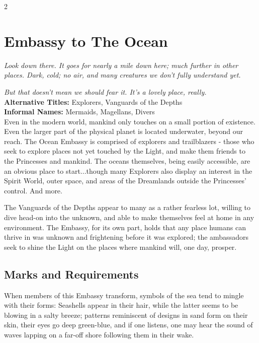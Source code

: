 \begin{multicols}{2}
\section*{Embassy to The Ocean}
\label{sec:EmbassyOcean}

\textit{Look down there. It goes for nearly a mile down here; much further in other places. Dark, cold; no air, and many creatures we don't fully understand yet.}

\textit{But that doesn't mean we should fear it. It's a lovely place, really.} \\

\noindent \textbf{Alternative Titles:} Explorers, Vanguards of the Depths\\

\noindent \textbf{Informal Names:} Mermaids, Magellans, Divers \\

\noindent Even in the modern world, mankind only touches on a small portion of existence. Even the larger part of the physical planet is located underwater, beyond our reach. The Ocean Embassy is comprised of explorers and trailblazers - those who seek to explore places not yet touched by the Light, and make them friends to the Princesses and mankind. The oceans themselves, being easily accessible, are an obvious place to start...though many Explorers also display an interest in the Spirit World, outer space, and areas of the Dreamlands outside the Princesses' control. And more.

The Vanguards of the Depths appear to many as a rather fearless lot, willing to dive head-on into the unknown, and able to make themselves feel at home in any environment. The Embassy, for its own part, holds that any place humans can thrive in was unknown and frightening before it was explored; the ambassadors seek to shine the Light on the places where mankind will, one day, prosper. 

\subsection*{Marks and Requirements}

When members of this Embassy transform, symbols of the sea tend to mingle with their forms: Seashells appear in their hair, while the latter seems to be blowing in a salty breeze; patterns reminiscent of designs in sand form on their skin, their eyes go deep green-blue, and if one listens, one may hear the sound of waves lapping on a far-off shore following them in their wake.


\end{multicols}

